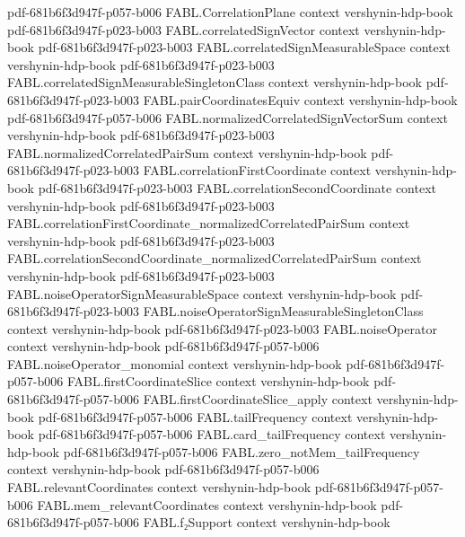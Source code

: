 \begin{theorem}
  {pdf-681b6f3d947f-p057-b006}
\proofstep
  {FABL.CorrelationPlane}
  {context}
  {vershynin-hdp-book}
  {pdf-681b6f3d947f-p023-b003}
\proofstep
  {FABL.correlatedSignVector}
  {context}
  {vershynin-hdp-book}
  {pdf-681b6f3d947f-p023-b003}
\proofstep
  {FABL.correlatedSignMeasurableSpace}
  {context}
  {vershynin-hdp-book}
  {pdf-681b6f3d947f-p023-b003}
\proofstep
  {FABL.correlatedSignMeasurableSingletonClass}
  {context}
  {vershynin-hdp-book}
  {pdf-681b6f3d947f-p023-b003}
\proofstep
  {FABL.pairCoordinatesEquiv}
  {context}
  {vershynin-hdp-book}
  {pdf-681b6f3d947f-p057-b006}
\proofstep
  {FABL.normalizedCorrelatedSignVectorSum}
  {context}
  {vershynin-hdp-book}
  {pdf-681b6f3d947f-p023-b003}
\proofstep
  {FABL.normalizedCorrelatedPairSum}
  {context}
  {vershynin-hdp-book}
  {pdf-681b6f3d947f-p023-b003}
\proofstep
  {FABL.correlationFirstCoordinate}
  {context}
  {vershynin-hdp-book}
  {pdf-681b6f3d947f-p023-b003}
\proofstep
  {FABL.correlationSecondCoordinate}
  {context}
  {vershynin-hdp-book}
  {pdf-681b6f3d947f-p023-b003}
\proofstep
  {FABL.correlationFirstCoordinate_normalizedCorrelatedPairSum}
  {context}
  {vershynin-hdp-book}
  {pdf-681b6f3d947f-p023-b003}
\proofstep
  {FABL.correlationSecondCoordinate_normalizedCorrelatedPairSum}
  {context}
  {vershynin-hdp-book}
  {pdf-681b6f3d947f-p023-b003}
\proofstep
  {FABL.noiseOperatorSignMeasurableSpace}
  {context}
  {vershynin-hdp-book}
  {pdf-681b6f3d947f-p023-b003}
\proofstep
  {FABL.noiseOperatorSignMeasurableSingletonClass}
  {context}
  {vershynin-hdp-book}
  {pdf-681b6f3d947f-p023-b003}
\proofstep
  {FABL.noiseOperator}
  {context}
  {vershynin-hdp-book}
  {pdf-681b6f3d947f-p057-b006}
\proofstep
  {FABL.noiseOperator_monomial}
  {context}
  {vershynin-hdp-book}
  {pdf-681b6f3d947f-p057-b006}
\proofstep
  {FABL.firstCoordinateSlice}
  {context}
  {vershynin-hdp-book}
  {pdf-681b6f3d947f-p057-b006}
\proofstep
  {FABL.firstCoordinateSlice_apply}
  {context}
  {vershynin-hdp-book}
  {pdf-681b6f3d947f-p057-b006}
\proofstep
  {FABL.tailFrequency}
  {context}
  {vershynin-hdp-book}
  {pdf-681b6f3d947f-p057-b006}
\proofstep
  {FABL.card_tailFrequency}
  {context}
  {vershynin-hdp-book}
  {pdf-681b6f3d947f-p057-b006}
\proofstep
  {FABL.zero_notMem_tailFrequency}
  {context}
  {vershynin-hdp-book}
  {pdf-681b6f3d947f-p057-b006}
\proofstep
  {FABL.relevantCoordinates}
  {context}
  {vershynin-hdp-book}
  {pdf-681b6f3d947f-p057-b006}
\proofstep
  {FABL.mem_relevantCoordinates}
  {context}
  {vershynin-hdp-book}
  {pdf-681b6f3d947f-p057-b006}
\proofstep
  {FABL.f₂Support}
  {context}
  {vershynin-hdp-book}

\end{theorem}
